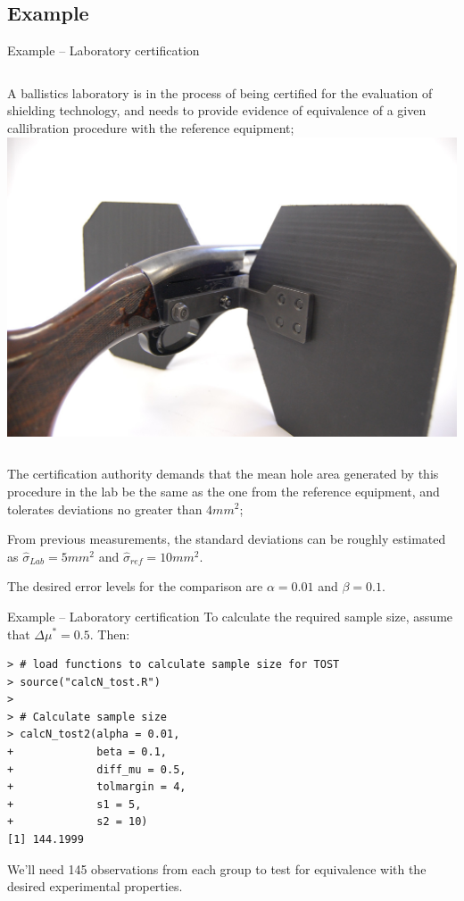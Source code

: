 \subsection{Example}

\begin{frame}{Example -- Laboratory certification}

\begin{columns}[T]
  A ballistics laboratory is in the process of being certified for the evaluation of shielding technology, and needs to provide evidence of equivalence of a given callibration procedure with the reference equipment;
  \includegraphics[width=\textwidth]{../img/Shotgun-Ballistic-Shield.png}
\end{columns}
\bigskip

The certification authority demands that the mean hole area generated by this procedure in the lab be the same as the one from the reference equipment, and tolerates deviations no greater than $4 mm^2$;
\bigskip

From previous measurements, the standard deviations can be roughly estimated as $\hat{\sigma}_{Lab} = 5 mm^2$ and $\hat{\sigma}_{ref} = 10 mm^2$.
\bigskip

The desired error levels for the comparison are $\alpha=0.01$ and $\beta = 0.1$.
\end{frame}

\begin{frame}[fragile]{Example -- Laboratory certification}
To calculate the required sample size, assume that $\Delta\mu^* = 0.5$. Then:
\begin{verbatim}
> # load functions to calculate sample size for TOST
> source("calcN_tost.R")
>
> # Calculate sample size
> calcN_tost2(alpha = 0.01,
+             beta = 0.1,
+             diff_mu = 0.5,
+             tolmargin = 4,
+             s1 = 5,
+             s2 = 10)
[1] 144.1999
\end{verbatim}
\medskip
We'll need 145 observations from each group to test for equivalence with the desired experimental properties.
\end{frame}

